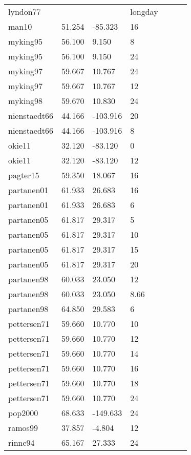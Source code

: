 \documentclass{article}
\begin{document}
\begin{table}[ht]
\begin{tabular}{|p{}|p{}|p{}|p{}|p{}|p{}|p{}|}
  lyndon77 &  &  & longday &  &  &  \\ 
  man10 & 51.254 & -85.323 & 16 &  &  &  \\ 
  myking95 & 56.100 & 9.150 & 8 &  &  &  \\ 
  myking95 & 56.100 & 9.150 & 24 &  &  &  \\ 
  myking97 & 59.667 & 10.767 & 24 &  &  &  \\ 
  myking97 & 59.667 & 10.767 & 12 &  &  &  \\ 
  myking98 & 59.670 & 10.830 & 24 &  &  &  \\ 
  nienstaedt66 & 44.166 & -103.916 & 20 &  &  &  \\ 
  nienstaedt66 & 44.166 & -103.916 & 8 &  &  &  \\ 
  okie11 & 32.120 & -83.120 & 0 &  &  &  \\ 
  okie11 & 32.120 & -83.120 & 12 &  &  &  \\ 
  pagter15 & 59.350 & 18.067 & 16 &  &  &  \\ 
  partanen01 & 61.933 & 26.683 & 16 &  &  &  \\ 
  partanen01 & 61.933 & 26.683 & 6 &  &  &  \\ 
  partanen05 & 61.817 & 29.317 & 5 &  &  &  \\ 
  partanen05 & 61.817 & 29.317 & 10 &  &  &  \\ 
  partanen05 & 61.817 & 29.317 & 15 &  &  &  \\ 
  partanen05 & 61.817 & 29.317 & 20 &  &  &  \\ 
  partanen98 & 60.033 & 23.050 & 12 &  &  &  \\ 
  partanen98 & 60.033 & 23.050 & 8.66 &  &  &  \\ 
  partanen98 & 64.850 & 29.583 & 6 &  &  &  \\ 
  pettersen71 & 59.660 & 10.770 & 10 &  &  &  \\ 
  pettersen71 & 59.660 & 10.770 & 12 &  &  &  \\ 
  pettersen71 & 59.660 & 10.770 & 14 &  &  &  \\ 
  pettersen71 & 59.660 & 10.770 & 16 &  &  &  \\ 
  pettersen71 & 59.660 & 10.770 & 18 &  &  &  \\ 
  pettersen71 & 59.660 & 10.770 & 24 &  &  &  \\ 
  pop2000 & 68.633 & -149.633 & 24 &  &  &  \\ 
  ramos99 & 37.857 & -4.804 & 12 &  &  &  \\ 
  rinne94 & 65.167 & 27.333 & 24 &  &  &  \\ 

\end{tabular}
\end{table}
\end{document}
